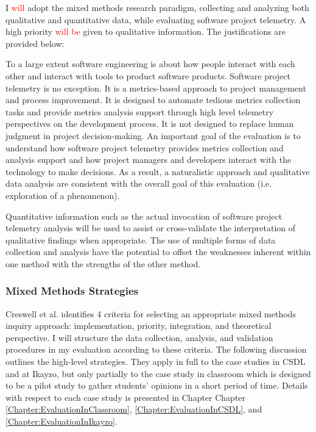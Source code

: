I \textcolor{red}{will} adopt the mixed methods research paradigm, collecting and analyzing both qualitative and quantitative data, while evaluating software project telemetry. A high priority \textcolor{red}{will be} given to qualitative information. The justifications are provided below:

To a large extent software engineering is about how people interact with each other and interact with tools to product software products. Software project telemetry is no exception. It is a metrics-based approach to project management and process improvement. It is designed to automate tedious metrics collection tasks and provide metrics analysis support through high level telemetry perspectives on the development process. It is not designed to replace human judgment in project decision-making. An important goal of the evaluation is to understand how software project telemetry provides metrics collection and analysis support and how project managers and developers interact with the technology to make decisions. As a result, a naturalistic approach and qualitative data analysis are consistent with the overall goal of this evaluation (i.e. exploration of a phenomenon). %

Quantitative information such as the actual invocation of software project telemetry analysis will be used to assist or cross-validate the interpretation of qualitative findings when appropriate. The use of multiple forms of data collection and analysis have the potential to offset the weaknesses inherent within one method with the strengths of the other method. 


\subsubsection{Mixed Methods Strategies}

Creswell et al. \cite{Creswell:2003b} identifies 4 criteria for selecting an appropriate mixed methods inquiry approach: implementation, priority, integration, and theoretical perspective. I will structure the data collection, analysis, and validation procedures in my evaluation according to these criteria. The following discussion outlines the high-level strategies. They apply in full to the case studies in CSDL and at Ikayzo, but only partially to the case study in classroom which is designed to be a pilot study to gather students' opinions in a short period of time. Details with respect to each case study is presented in Chapter
Chapter \ref{Chapter:EvaluationInClassroom}, 
\ref{Chapter:EvaluationInCSDL}, 
and \ref{Chapter:EvaluationInIkayzo}.

